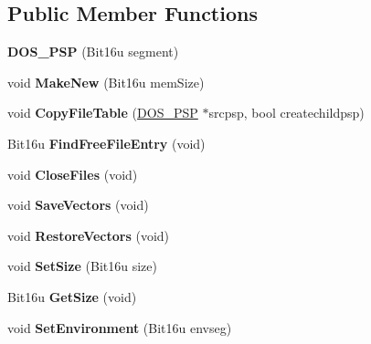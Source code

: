 \subsection*{Public Member Functions}
\begin{DoxyCompactItemize}
\item 
\hypertarget{classDOS__PSP_a63819aa4ad95757c911450add9c3e8d2}{{\bfseries D\-O\-S\-\_\-\-P\-S\-P} (Bit16u segment)}\label{classDOS__PSP_a63819aa4ad95757c911450add9c3e8d2}

\item 
\hypertarget{classDOS__PSP_a55b6d26ed8954f7ef6c45fb07d12ed87}{void {\bfseries Make\-New} (Bit16u mem\-Size)}\label{classDOS__PSP_a55b6d26ed8954f7ef6c45fb07d12ed87}

\item 
\hypertarget{classDOS__PSP_ac9d915b8669d8ff2320f9f1761295c96}{void {\bfseries Copy\-File\-Table} (\hyperlink{classDOS__PSP}{D\-O\-S\-\_\-\-P\-S\-P} $\ast$srcpsp, bool createchildpsp)}\label{classDOS__PSP_ac9d915b8669d8ff2320f9f1761295c96}

\item 
\hypertarget{classDOS__PSP_afdeb504910e039b3c8d11e06d4ec5ff4}{Bit16u {\bfseries Find\-Free\-File\-Entry} (void)}\label{classDOS__PSP_afdeb504910e039b3c8d11e06d4ec5ff4}

\item 
\hypertarget{classDOS__PSP_af12c39db39710c714734d676a66bea39}{void {\bfseries Close\-Files} (void)}\label{classDOS__PSP_af12c39db39710c714734d676a66bea39}

\item 
\hypertarget{classDOS__PSP_ad5ed56e031815fb7881224c61fa0051f}{void {\bfseries Save\-Vectors} (void)}\label{classDOS__PSP_ad5ed56e031815fb7881224c61fa0051f}

\item 
\hypertarget{classDOS__PSP_afa00392a13950a65d3faaab37ff281b0}{void {\bfseries Restore\-Vectors} (void)}\label{classDOS__PSP_afa00392a13950a65d3faaab37ff281b0}

\item 
\hypertarget{classDOS__PSP_a43b18fe590a04ea160810c76d7009aba}{void {\bfseries Set\-Size} (Bit16u size)}\label{classDOS__PSP_a43b18fe590a04ea160810c76d7009aba}

\item 
\hypertarget{classDOS__PSP_ac8cb727be4728d84161af8b4ede8eea0}{Bit16u {\bfseries Get\-Size} (void)}\label{classDOS__PSP_ac8cb727be4728d84161af8b4ede8eea0}

\item 
\hypertarget{classDOS__PSP_a9d0530a763b3497f915e9e716f782fd0}{void {\bfseries Set\-Environment} (Bit16u envseg)}\label{classDOS__PSP_a9d0530a763b3497f915e9e716f782fd0}


\end{DoxyCompactItemize}
